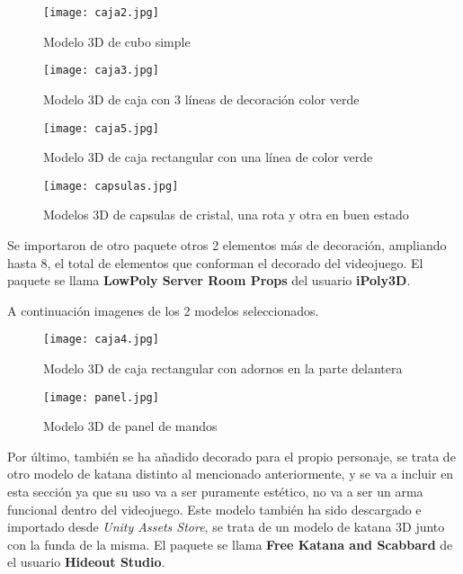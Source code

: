 \begin{figure}[H]
    \centering
    \texttt{[image: caja2.jpg]}
    \caption{Modelo 3D de cubo simple}
\end{figure}

\begin{figure}[H]
    \centering
    \texttt{[image: caja3.jpg]}
    \caption{Modelo 3D de caja con 3 líneas de decoración color verde}
\end{figure}

\begin{figure}[H]
    \centering
    \texttt{[image: caja5.jpg]}
    \caption{Modelo 3D de caja rectangular con una línea de color verde}
\end{figure}

\begin{figure}[H]
    \centering
    \texttt{[image: capsulas.jpg]}
    \caption{Modelos 3D de capsulas de cristal, una rota y otra en buen estado}
\end{figure}

Se importaron de otro paquete otros 2 elementos más de decoración, ampliando hasta 8, el total de elementos que conforman el decorado del videojuego. El paquete se llama \textbf{LowPoly Server Room Props} del usuario \textbf{iPoly3D}.

A continuación imagenes de los 2 modelos seleccionados.

\begin{figure}[H]
    \centering
    \texttt{[image: caja4.jpg]}
    \caption{Modelo 3D de caja rectangular con adornos en la parte delantera}
\end{figure}

\begin{figure}[H]
    \centering
    \texttt{[image: panel.jpg]}
    \caption{Modelo 3D de panel de mandos}
\end{figure}

Por último, también se ha añadido decorado para el propio personaje, se trata de otro modelo de katana distinto al mencionado anteriormente, y se va a incluir en esta sección ya que su uso va a ser puramente estético, no va a ser un arma funcional dentro del videojuego. Este modelo también ha sido descargado e importado desde \textit{Unity Assets Store}, se trata de un modelo de katana 3D junto con la funda de la misma. El paquete se llama \textbf{Free Katana and Scabbard} de el usuario \textbf{Hideout Studio}.\\

